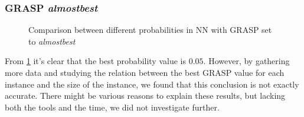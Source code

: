 \subsubsection{GRASP \textit{almostbest}}

\begin{figure}[htbp]
	\centering
	\caption{Comparison between different probabilities in NN with GRASP set to \textit{almostbest}}
    \label{fig:nnAlmostbestCmp0}
\end{figure}

From \figurename{ \ref{fig:nnAlmostbestCmp0}} it's clear that the best probability value is $0.05$.
However, by gathering more data and studying the relation between the best GRASP value for each instance and the size of the instance, we found that this conclusion is not exactly accurate.
There might be various reasons to explain these results, but lacking both the tools and the time, we did not investigate further.

